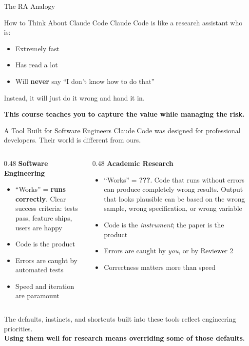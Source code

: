 \documentclass[aspectratio=169, 11pt]{beamer}
\begin{document}
\begin{frame}{The RA Analogy}
  \begin{block}{How to Think About Claude Code}
    Claude Code is like a research assistant who is:
    \begin{itemize}
      \item Extremely fast
      \item Has read a lot
      \item Will \textbf{never} say ``I don't know how to do that''
    \end{itemize}
    \vspace{0.3em}
    Instead, it will just do it wrong and hand it in.
  \end{block}

  \vspace{0.5em}
  \textbf{This course teaches you to capture the value while managing the risk.}
\end{frame}

\begin{frame}{A Tool Built for Software Engineers}
  Claude Code was designed for professional developers. Their world is different from ours.

  \vspace{0.5em}
  \begin{columns}[T]
    \begin{column}{0.48\textwidth}
      \textbf{Software Engineering}
      \begin{itemize}
        \item ``Works'' = \textbf{runs correctly}. Clear success criteria: tests pass, feature ships, users are happy
        \item Code is the product
        \item Errors are caught by automated tests
        \item Speed and iteration are paramount
      \end{itemize}
    \end{column}
    \begin{column}{0.48\textwidth}
      \textbf{Academic Research}
      \begin{itemize}
        \item ``Works'' = \textbf{???}. Code that runs without errors can produce completely wrong results. Output that looks plausible can be based on the wrong sample, wrong specification, or wrong variable
        \item Code is the \textit{instrument}; the paper is the product
        \item Errors are caught by \textit{you}, or by Reviewer 2
        \item Correctness matters more than speed
      \end{itemize}
    \end{column}
  \end{columns}

  \vspace{0.5em}
  The defaults, instincts, and shortcuts built into these tools reflect engineering priorities.\\
  \textbf{Using them well for research means overriding some of those defaults.}
\end{frame}
\end{document}
